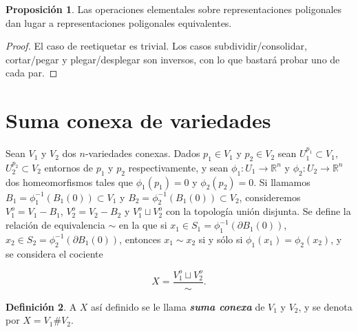 \documentclass[10pt]{report}
\newcommand{\R}{\mathbb{R}}
\theoremstyle{definition}
\newtheorem{defin}{Definición}[section]
\newtheorem{prop}[defin]{Proposición}
\begin{document}
\begin{prop}%
Las operaciones elementales sobre representaciones poligonales dan lugar a representaciones poligonales equivalentes.
\end{prop}
\begin{proof}
El caso de reetiquetar es trivial. Los casos subdividir/consolidar, cortar/pegar y plegar/desplegar son inversos, con lo que bastará probar uno de cada par.  
\end{proof}

\section{Suma conexa de variedades}


Sean $V_1$ y $V_2$ dos $n$-variedades conexas. Dados $p_1\in V_1$ y $p_2\in V_2$ sean $U_1^{p_1}\subset V_1$, $U_2^{p_2}\subset V_2$  entornos de $p_1$ y $p_2$ respectivamente, y sean $\phi_1:U_1\to\R^n$ y $\phi_2:U_2\to\R^n$ dos homeomorfismos tales que $\phi_1(p_1)=0$ y $\phi_2(p_2)=0$. Si llamamos $B_1=\phi_1^{-1}(B_1(0))\subset V_1$ y $B_2=\phi_2^{-1}(B_1(0))\subset V_2$, consideremos $V_1^o=V_1-B_1$, $V_2^o=V_2-B_2$ y $V_1^o \sqcup V_2^o$ con la topología unión disjunta.
Se define la relación de equivalencia $\sim$ en la que si $x_1\in S_1=\phi_1^{-1}(\partial B_1(0))$, $x_2\in S_2=\phi_2^{-1}(\partial B_1(0))$, entonces $x_1\sim x_2$ si y sólo si $\phi_1(x_1)=\phi_2(x_2)$, y se considera el cociente 

$$X=\frac{V_1^o\sqcup V_2^o}{\sim}.$$

\begin{defin}%
A $X$ así definido se le llama \textbf{\textit{suma conexa}} de $V_1$ y $V_2$, y se denota por $X=V_1\#V_2$.
\end{defin}
\end{document}

